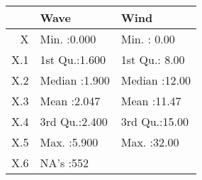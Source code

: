 \begin{tabular}{rll}
  \toprule
 &      Wave &      Wind \\ 
  \midrule
X & Min.   :0.000   & Min.   : 0.00   \\ 
  X.1 & 1st Qu.:1.600   & 1st Qu.: 8.00   \\ 
  X.2 & Median :1.900   & Median :12.00   \\ 
  X.3 & Mean   :2.047   & Mean   :11.47   \\ 
  X.4 & 3rd Qu.:2.400   & 3rd Qu.:15.00   \\ 
  X.5 & Max.   :5.900   & Max.   :32.00   \\ 
  X.6 & NA's   :552   &  \\ 
   \bottomrule
\end{tabular}
